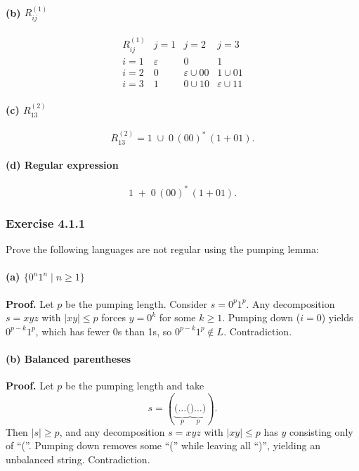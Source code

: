 \documentclass{article}
\theoremstyle{theorem}
\theoremstyle{definition}
\theoremstyle{remark}
\begin{document}
\paragraph{(b) \(R_{ij}^{(1)}\)}
\[
\begin{array}{c|ccc}
R_{ij}^{(1)} & j=1 & j=2 & j=3\\\hline
i=1 & \varepsilon & 0 & 1\\
i=2 & 0 & \varepsilon\cup00 & 1\cup01\\
i=3 & 1 & 0\cup10 & \varepsilon\cup11
\end{array}
\]
\paragraph{(c) \(R_{13}^{(2)}\)}
\[
R_{13}^{(2)} = 1 \;\cup\;0\,(00)^*\,(1+01).
\]
\paragraph{(d) Regular expression}
\[
1 \;+\;0\,(00)^*\,(1+01).
\]


\subsubsection*{Exercise 4.1.1}
Prove the following languages are not regular using the pumping lemma:

\paragraph{(a) \(\{0^n1^n\mid n\ge1\}\)}
\textbf{Proof.} Let \(p\) be the pumping length. Consider \(s=0^p1^p\). Any decomposition \(s=xyz\) with \(\lvert xy\rvert\le p\) forces \(y=0^k\) for some \(k\ge1\). Pumping down (\(i=0\)) yields \(0^{p-k}1^p\), which has fewer 0s than 1s, so \(0^{p-k}1^p\notin L\). Contradiction.

\paragraph{(b) Balanced parentheses}
\textbf{Proof.} Let \(p\) be the pumping length and take 
\[
s = (\underbrace{( \dots (}_{p}\underbrace{) \dots )}_{p}).
\]
Then \(\lvert s\rvert\ge p\), and any decomposition \(s=xyz\) with \(\lvert xy\rvert\le p\) has \(y\) consisting only of “(”. Pumping down removes some “(” while leaving all “)”, yielding an unbalanced string. Contradiction.
\end{document}
